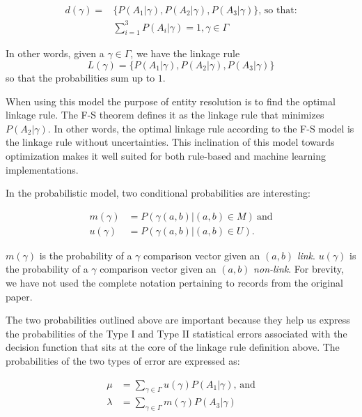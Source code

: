 \documentclass[journal]{IEEEtran}
\begin{document}
    \begin{align}
        d(\gamma) = &\{P(A_1|\gamma),P(A_2|\gamma),P(A_3|\gamma)\}\textrm{, so
        that:}\nonumber\\
        &\sum_{i=1}^{3}P(A_i|\gamma) = 1\nonumber, \gamma \in \varGamma\nonumber
    \end{align}

    In other words, given a $\gamma \in \varGamma$, we have the linkage rule
    \[
        L(\gamma) = \{P(A_1|\gamma), P(A_2|\gamma), P(A_3|\gamma)\}
    \]
    so that the probabilities sum up to $1$.

    When using this model the purpose of entity resolution is to find the
    optimal linkage rule.
    The F-S theorem defines it as the linkage rule that minimizes
    $P(A_2|\gamma)$.
    In other words, the optimal linkage rule according to the F-S model is the
    linkage rule without uncertainties.
    This inclination of this model towards optimization makes it well suited for
    both rule-based\cite{oyster2012} and machine learning\cite{deepm2020}
    implementations.
    
    In the probabilistic model, two conditional probabilities are interesting:

    \begin{align}
        m(\gamma)&=P(\gamma(a, b) | (a, b) \in M)~\textrm{and}\nonumber\\
        u(\gamma)&=P(\gamma(a, b) | (a, b) \in U)\textrm{.}\nonumber
    \end{align}

    \noindent
    $m(\gamma)$ is the probability of a $\gamma$ comparison vector given an
    $(a, b)$ \textit{link}.
    $u(\gamma)$ is the probability of a $\gamma$ comparison vector given an
    $(a, b)$ \textit{non-link}.
    For brevity, we have not used the complete notation pertaining to records
    from the original paper.

    The two probabilities outlined above are important because they help us
    express the probabilities of the Type I and Type II statistical errors
    associated with the decision function that sits at the core of the linkage
    rule definition above.
    The probabilities of the two types of error are expressed as:

    \begin{align}
        \mu&=\sum_{\gamma \in \varGamma}u(\gamma)P(A_1|\gamma)\textrm{,~and}\nonumber\\
        \lambda&=\sum_{\gamma \in \varGamma}m(\gamma)P(A_3|\gamma)\nonumber
    \end{align}
\end{document}
